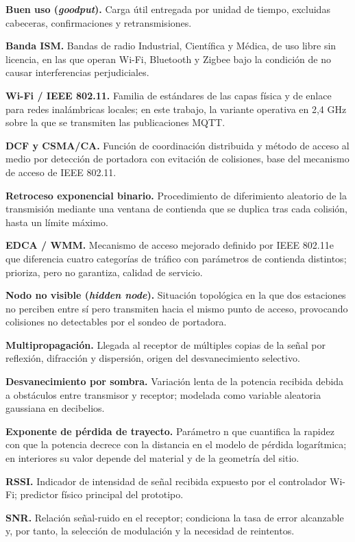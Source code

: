 \documentclass[
  12pt,
]{article}
\begin{document}
\textbf{Buen uso (\emph{goodput}).} Carga útil entregada por unidad de
tiempo, excluidas cabeceras, confirmaciones y retransmisiones.

\textbf{Banda ISM.} Bandas de radio Industrial, Científica y Médica, de
uso libre sin licencia, en las que operan Wi-Fi, Bluetooth y Zigbee bajo
la condición de no causar interferencias perjudiciales.

\textbf{Wi-Fi / IEEE 802.11.} Familia de estándares de las capas física
y de enlace para redes inalámbricas locales; en este trabajo, la
variante operativa en 2,4 GHz sobre la que se transmiten las
publicaciones MQTT.

\textbf{DCF y CSMA/CA.} Función de coordinación distribuida y método de
acceso al medio por detección de portadora con evitación de colisiones,
base del mecanismo de acceso de IEEE 802.11.

\textbf{Retroceso exponencial binario.} Procedimiento de diferimiento
aleatorio de la transmisión mediante una ventana de contienda que se
duplica tras cada colisión, hasta un límite máximo.

\textbf{EDCA / WMM.} Mecanismo de acceso mejorado definido por IEEE
802.11e que diferencia cuatro categorías de tráfico con parámetros de
contienda distintos; prioriza, pero no garantiza, calidad de servicio.

\textbf{Nodo no visible (\emph{hidden node}).} Situación topológica en
la que dos estaciones no perciben entre sí pero transmiten hacia el
mismo punto de acceso, provocando colisiones no detectables por el
sondeo de portadora.

\textbf{Multipropagación.} Llegada al receptor de múltiples copias de la
señal por reflexión, difracción y dispersión, origen del desvanecimiento
selectivo.

\textbf{Desvanecimiento por sombra.} Variación lenta de la potencia
recibida debida a obstáculos entre transmisor y receptor; modelada como
variable aleatoria gaussiana en decibelios.

\textbf{Exponente de pérdida de trayecto.} Parámetro n que cuantifica la
rapidez con que la potencia decrece con la distancia en el modelo de
pérdida logarítmica; en interiores su valor depende del material y de la
geometría del sitio.

\textbf{RSSI.} Indicador de intensidad de señal recibida expuesto por el
controlador Wi-Fi; predictor físico principal del prototipo.

\textbf{SNR.} Relación señal-ruido en el receptor; condiciona la tasa de
error alcanzable y, por tanto, la selección de modulación y la necesidad
de reintentos.
\end{document}
